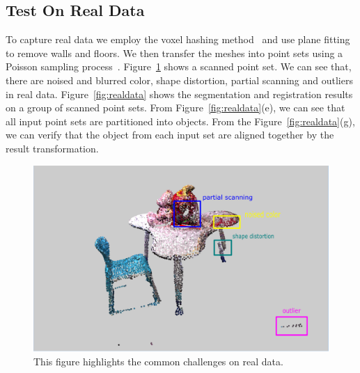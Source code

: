 \subsection{Test On Real Data}
To capture real data we employ the voxel hashing method~\cite{VXH} and use plane fitting to remove walls and floors. 
We then transfer the meshes into point sets using a Poisson sampling process~\cite{PossionSampling}.
Figure~\ref{fig:challenge} shows a scanned point set. We can see that, there are noised and blurred color, shape distortion, partial scanning and outliers in real data.
%
Figure~{\ref{fig:realdata}} shows the segmentation and registration results on a group of scanned point sets.
From Figure~\ref{fig:realdata}(e), we can see that all input point sets are partitioned into objects. From the Figure~\ref{fig:realdata}(g), we can verify that the object from each input set are aligned together by the result transformation.
\begin{figure}
	\centering
	\includegraphics[width=\linewidth]{images/challenge/challenge}
	\caption{\label{fig:challenge}This figure highlights the common challenges on real data.}
\end{figure}
